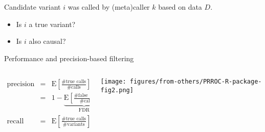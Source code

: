 \documentclass{beamer} %
\begin{document}
\begin{frame}{}

Candidate variant \(i\) was called by (meta)caller \(k\) based on data \(D\).
\begin{itemize}
\item Is \(i\) a true variant?
\item Is \(i\) also causal?
\end{itemize}

\bigskip

\end{frame}

\begin{frame}{Performance and precision-based filtering}
\begin{columns}[t]
\small
\begin{column}{0.45\textwidth}
\begin{eqnarray*}
\text{precision} &=& \text{E} \left[ \frac{\text{\# true calls}}{\text{\# calls}} \right] \\
&=& 1 - \underbrace{\text{E} \left[ \frac{\text{\# false calls}}{\text{\# calls}} \right]}_{\text{FDR}} \\
\text{recall} &=& \text{E} \left[ \frac{\text{\# true calls}}{\text{\# variants}} \right]
\end{eqnarray*}
\end{column}
\begin{column}{0.6\textwidth}

\texttt{[image: figures/from-others/PRROC-R-package-fig2.png]}
\end{column}
\end{columns}

\end{frame}
\end{document}
